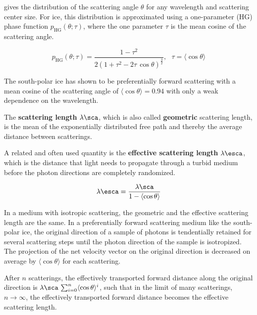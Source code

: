  gives the distribution of the scattering angle $\theta$ for any wavelength and scattering center size. For ice, this distribution is approximated using a one-parameter  (HG) phase function $p_\text{HG}(\theta; \tau)$, where the one parameter $\tau$ is the mean cosine of the scattering angle. \cite{lundberg}

\newcommand\meancostheta{\langle \cos \theta \rangle}
$$ p_\text{HG}(\theta; \tau) = \frac{1 - \tau^2}{2(1 + \tau^2 - 2\tau\, \cos \theta)^\frac{3}{2}}, \ \ \ \tau = \meancostheta $$

The south-polar ice has shown to be preferentially forward scattering with a mean cosine of the scattering angle of $\meancostheta = 0.94$ with only a weak dependence on the wavelength. \cite{ackermann}

The \textbf{scattering length} $\lambda\sca$, which is also called \textbf{geometric} scattering length, is the mean of the exponentially distributed free path and thereby the average distance between scatterings. \cite{ackermann}

A related and often used quantity is the \textbf{effective scattering length} $\lambda\esca$, which is the distance that light needs to propagate through a turbid medium before the photon directions are completely randomized. \cite{lundberg}

\begin{equation}
  \lambda\esca = \frac{\lambda\sca}{1 - \meancostheta}
\end{equation}

In a medium with isotropic scattering, the geometric and the effective scattering length are the same. In a preferentially forward scattering medium like the south-polar ice, the original direction of a sample of photons is tendentially retained for several scattering steps until the photon direction of the sample is isotropized. The projection of the net velocity vector on the original direction is decreased on average by $\meancostheta$ for each scattering. \cite{lundberg}

After $n$ scatterings, the effectively transported forward distance along the original direction is $\lambda\sca\,\sum_{i=0}^n \meancostheta^i$, such that in the limit of many scatterings, $n \rightarrow \infty$, the effectively transported forward distance becomes the effective scattering length. \cite{lundberg}\cite{ackermann}

